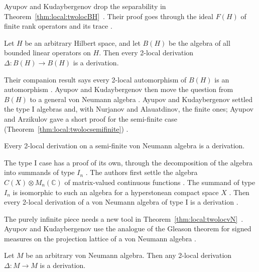Ayupov and Kudaybergenov drop the separability in
Theorem~\ref{thm:local:twolocBH}~\cite[p.~16]{AyupovKudaybergenov2012}. Their proof goes through
the ideal $F(H)$ of finite rank operators and its trace
\cite[p.~16]{AyupovKudaybergenov2012}.

\begin{theorem}\label{thm:local:twolocBH}
Let $H$ be an arbitrary Hilbert space, and let $B(H)$ be the algebra of all
bounded linear operators on $H$. Then every 2-local derivation
$\Delta\colon B(H)\to B(H)$ is a derivation.
\end{theorem}

Their companion result says every 2-local automorphism of $B(H)$ is an
automorphism \cite[Theorem~2.4, p.~17]{AyupovKudaybergenov2012}. Ayupov and
Kudaybergenov then move the question from $B(H)$ to a general von Neumann
algebra \cite[p.~9]{AyupovArzikulov2014}. Ayupov and Kudaybergenov settled
the type I algebras and, with Nurjanov and Alauatdinov, the finite ones;
Ayupov and Arzikulov gave a short proof for the semi-finite case (Theorem~\ref{thm:local:twolocsemifinite})
\cite[p.~9]{AyupovArzikulov2014}.\begin{theorem}\label{thm:local:twolocsemifinite}
Every 2-local derivation on a semi-finite von Neumann algebra is a
derivation.
\end{theorem}

The type I case has a proof of its own, through the decomposition of the
algebra into summands of type $I_n$ \cite[p.~1]{AyupovArzikulov2011TwoLocal}.
The authors first settle the algebra $C(X)\otimes M_n(\mathbb{C})$ of
matrix-valued continuous functions \cite[Theorem~1,
p.~3]{AyupovArzikulov2011TwoLocal}. The summand of type $I_n$ is isomorphic to
such an algebra for a hyperstonean compact space $X$
\cite[p.~7]{AyupovArzikulov2011TwoLocal}. Then every 2-local derivation of a
von Neumann algebra of type I is a derivation \cite[Theorem~5,
p.~7]{AyupovArzikulov2011TwoLocal}.

The purely infinite piece needs a new tool in
Theorem~\ref{thm:local:twolocvN}~\cite[p.~1]{AyupovKudaybergenov2015}. Ayupov and Kudaybergenov
use the analogue of the Gleason theorem for signed measures on the
projection lattice of a von Neumann algebra
\cite[p.~1]{AyupovKudaybergenov2015}.

\begin{theorem}\label{thm:local:twolocvN}
Let $M$ be an arbitrary von Neumann algebra. Then any 2-local derivation
$\Delta\colon M\to M$ is a derivation.
\end{theorem}

